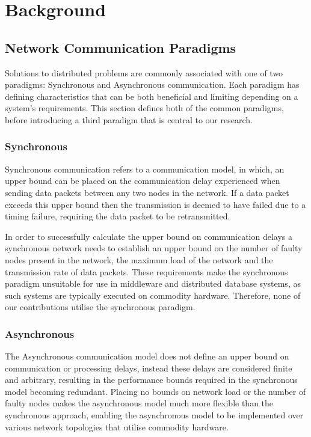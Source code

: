  \chapter{Background}

    \graphicspath{{Chapter2-Background/Figs/Vector/}{Chapter2-Background/Figs/}}

\section[Network Communication Paradigms]{Network Communication Paradigms}
Solutions to distributed problems are commonly associated with one of two paradigms: Synchronous and Asynchronous communication. Each paradigm has defining characteristics that can be both beneficial and limiting depending on a system's requirements.  This section defines both of the common paradigms, before introducing a third paradigm that is central to our research.  

	\subsection{Synchronous}
	Synchronous communication refers to a communication model, in which, an upper bound can be placed on the communication delay experienced when sending data packets between any two nodes in the network. If a data packet exceeds this upper bound then the transmission is deemed to have failed due to a timing failure, requiring the data packet to be retransmitted. 
	
	In order to successfully calculate the upper bound on communication delays a synchronous network needs to establish an upper bound on the number of faulty nodes present in the network, the maximum load of the network and the transmission rate of data packets\citep{Cristian:1996:SA:227210.227231}. These requirements make the synchronous paradigm unsuitable for use in middleware and distributed database systems, as such systems are typically executed on commodity hardware.  Therefore, none of our contributions utilise the synchronous paradigm.  
	 
	\subsection{Asynchronous}
	The Asynchronous communication model does not define an upper bound on communication or processing delays, instead these delays are considered finite and arbitrary, resulting in the performance bounds required in the synchronous model becoming redundant\citep{Cristian:1996:SA:227210.227231}. Placing no bounds on network load or the number of faulty nodes makes the asynchronous model much more flexible than the synchronous approach, enabling the asynchronous model to be implemented over various network topologies that utilise commodity hardware. 

